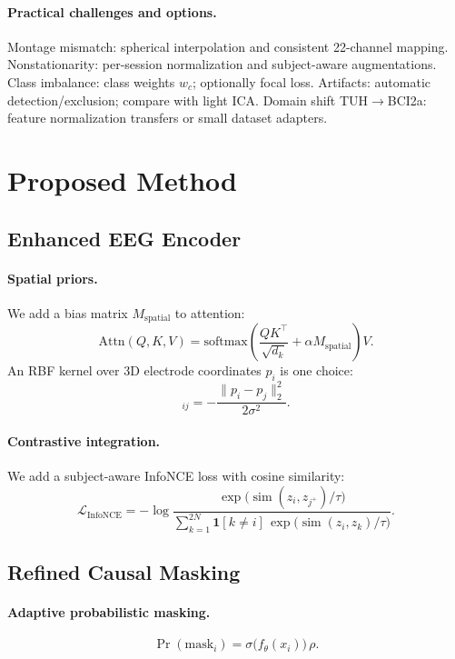 \documentclass[letterpaper]{article}
\newcommand{\simfunc}{\operatorname{sim}}
\begin{document}
\paragraph{Practical challenges and options.} Montage mismatch: spherical interpolation and consistent 22-channel mapping. Nonstationarity: per-session normalization and subject-aware augmentations. Class imbalance: class weights $w_c$; optionally focal loss. Artifacts: automatic detection/exclusion; compare with light ICA. Domain shift TUH$\to$BCI2a: feature normalization transfers or small dataset adapters.

\section{Proposed Method}
\subsection{Enhanced EEG Encoder}
\paragraph{Spatial priors.} We add a bias matrix $M_{\mathrm{spatial}}$ to attention:
\begin{equation}
\mathrm{Attn}(Q,K,V) = \mathrm{softmax}\!\left( \frac{QK^\top}{\sqrt{d_k}} + \alpha M_{\mathrm{spatial}} \right) V.
\end{equation}
An RBF kernel over 3D electrode coordinates $p_i$ is one choice:
\begin{equation}
[M_{\mathrm{spatial}}]_{ij} = -\frac{\lVert p_i - p_j \rVert_2^2}{2\sigma^2}.
\end{equation}

\paragraph{Contrastive integration.} We add a subject-aware InfoNCE loss with cosine similarity:
\begin{equation}
\mathcal{L}_{\mathrm{InfoNCE}} = -\log \frac{\exp\big(\simfunc(z_i, z_{j^+})/\tau\big)}{\sum_{k=1}^{2N} \mathbf{1}[k\neq i] \, \exp\big(\simfunc(z_i, z_k)/\tau\big)}.
\end{equation}

\subsection{Refined Causal Masking}
\paragraph{Adaptive probabilistic masking.}
\begin{equation}
\Pr(\mathrm{mask}_i) = \sigma\big(f_\theta(x_i)\big) \, \rho.
\end{equation}
\end{document}
